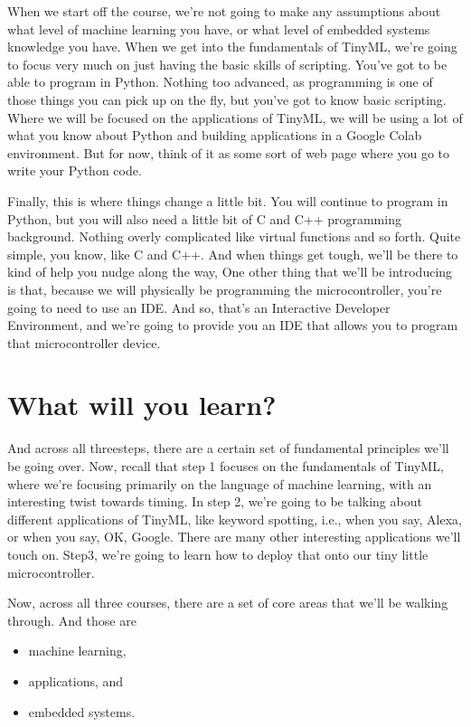 When we start off the course, we're not going to make any assumptions about what level of machine learning you have, or what level of embedded systems knowledge you have.
When we get into the fundamentals of TinyML, we're going to focus very much on just having the basic skills of scripting.
You've got to be able to program in Python.
Nothing too advanced, as programming is one of those things you can pick up on the fly, but you've got to know basic scripting. Where we will be focused on the applications of TinyML, we will be using a lot of what you know about Python and building applications in a Google Colab environment.
But for now, think of it as some sort of web page where you go to write your Python code.


Finally, this is where things change a little bit.
You will continue to program in Python, but you will also need a little bit of C and C++ programming background.
Nothing overly complicated like virtual functions and so forth.
Quite simple, you know, like C and C++.
And when things get tough, we'll be there to kind of help you nudge along the way, One other thing that we'll be introducing  is that, because we will physically be programming the microcontroller, you're going to need to use an IDE.
And so, that's an Interactive Developer Environment, and we're going to provide you an IDE that allows you
to program that microcontroller device.



\section{What will you learn?}


And across all threesteps, there are a certain set of fundamental principles we'll be going over.
Now, recall that step 1 focuses on the fundamentals of TinyML, where we're focusing primarily on the language of machine learning, with an interesting twist towards timing.
In step 2, we're going to be talking about different applications of TinyML, like keyword spotting, i.e., when you say, Alexa, or when you say, OK, Google.
There are many other interesting applications we'll touch on.
Step3, we're going to learn how to deploy that onto our tiny little microcontroller.

Now, across all three courses, there are a set of core areas that we'll be walking through.
And those are 

\begin{itemize}
  \item machine learning, 
  \item applications, and 
  \item embedded systems.
\end{itemize}

